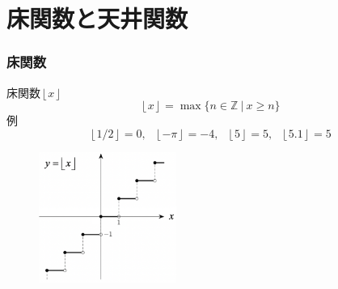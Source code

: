 \documentclass[dvipdfmx,cjk,10.2pt]{beamer}
\newcommand{\Z}{\mathbb{Z}}
\theoremstyle{definition}
\begin{document}

\section{床関数と天井関数}


\begin{frame}
\frametitle{床関数}   


床関数$\left \lfloor{x}\right \rfloor $
$$
\left \lfloor{x}\right \rfloor = \max\{ n \in \Z \ | \ x \ge n\}
$$
例
$$
\left \lfloor{1/2}\right \rfloor=0, \ \ \  \left \lfloor{-\pi}\right \rfloor=-4, \ \ \ \left \lfloor{5}\right \rfloor=5,  \ \ \ \left \lfloor{5.1}\right \rfloor=5
$$

\vspace{-1mm}

\begin{figure}[htbp]
 \begin{center} 
  \includegraphics[width=45mm]{floor.png}
 \end{center}
\end{figure}
\vspace{-4mm}

\end{frame}



\end{document}
